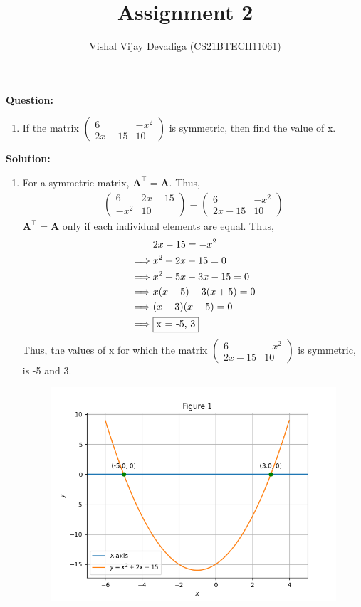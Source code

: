 \documentclass[journal,12pt,twocolumn]{IEEEtran}
\title{Assignment 2}
\author{Vishal Vijay Devadiga (CS21BTECH11061)}
\date{}
\let\vec\mathbf
\newcommand{\myvec}[1]{\ensuremath{\begin{pmatrix}#1\end{pmatrix}}}
\newcommand{\question}{\noindent \textbf{Question: }}
\newcommand{\solution}{\noindent \textbf{Solution: }}
\begin{document}
\maketitle
\question
\begin{enumerate}[label=]
	\item If the matrix $\myvec{6 & -x^2 \\ 2x - 15 & 10}$ is symmetric, then find the value of x.
\end{enumerate}
\solution
\begin{enumerate}[label=]
	\item For a symmetric matrix, $\vec{A}^{\top} = \vec{A}$. Thus,
	\begin{align}
		\myvec{6 & 2x - 15 \\ -x^2 & 10} = \myvec{6 & -x^2 \\ 2x - 15 & 10}
	\end{align}
	$\vec{A}^{\top} = \vec{A}$ only if each individual elements are equal. Thus,
	\begin{align}
		&2x - 15 = -x^2
		\\
		\implies &x^2 + 2x - 15 = 0
		\\
		\implies &x^2 + 5x - 3x -15 = 0
		\\
		\implies &x(x+5) - 3(x+5) =0
		\\
		\implies &(x-3)(x+5) = 0
		\\
		\implies &\fbox{x = -5, 3}
	\end{align}
	Thus, the values of x for which the matrix $\myvec{6 & -x^2 \\ 2x - 15 & 10}$ is symmetric, is -5 and 3. \\
	\begin{figure}[h]
	\centering
	\includegraphics[scale = 0.6]{./figs/Figure.png}

\end{figure}
\end{enumerate}
\end{document}
